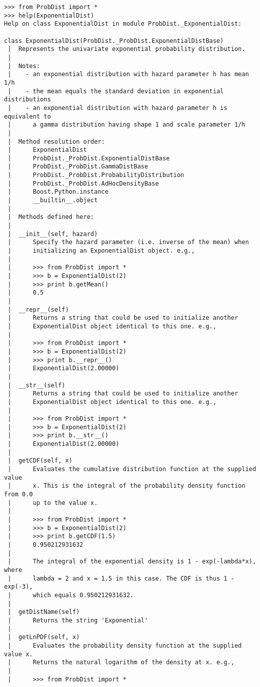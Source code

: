\documentclass[10pt]{article}
\begin{document}
{\tiny
\begin{verbatim}
>>> from ProbDist import *
>>> help(ExponentialDist)
Help on class ExponentialDist in module ProbDist._ExponentialDist:

class ExponentialDist(ProbDist._ProbDist.ExponentialDistBase)
 |  Represents the univariate exponential probability distribution.
 |
 |  Notes:
 |    - an exponential distribution with hazard parameter h has mean 1/h
 |    - the mean equals the standard deviation in exponential distributions
 |    - an exponential distribution with hazard parameter h is equivalent to
 |      a gamma distribution having shape 1 and scale parameter 1/h
 |
 |  Method resolution order:
 |      ExponentialDist
 |      ProbDist._ProbDist.ExponentialDistBase
 |      ProbDist._ProbDist.GammaDistBase
 |      ProbDist._ProbDist.ProbabilityDistribution
 |      ProbDist._ProbDist.AdHocDensityBase
 |      Boost.Python.instance
 |      __builtin__.object
 |
 |  Methods defined here:
 |
 |  __init__(self, hazard)
 |      Specify the hazard parameter (i.e. inverse of the mean) when
 |      initializing an ExponentialDist object. e.g.,
 |
 |      >>> from ProbDist import *
 |      >>> b = ExponentialDist(2)
 |      >>> print b.getMean()
 |      0.5
 |
 |  __repr__(self)
 |      Returns a string that could be used to initialize another
 |      ExponentialDist object identical to this one. e.g.,
 |
 |      >>> from ProbDist import *
 |      >>> b = ExponentialDist(2)
 |      >>> print b.__repr__()
 |      ExponentialDist(2.00000)
 |
 |  __str__(self)
 |      Returns a string that could be used to initialize another
 |      ExponentialDist object identical to this one. e.g.,
 |
 |      >>> from ProbDist import *
 |      >>> b = ExponentialDist(2)
 |      >>> print b.__str__()
 |      ExponentialDist(2.00000)
 |
 |  getCDF(self, x)
 |      Evaluates the cumulative distribution function at the supplied value
 |      x. This is the integral of the probability density function from 0.0
 |      up to the value x.
 |
 |      >>> from ProbDist import *
 |      >>> b = ExponentialDist(2)
 |      >>> print b.getCDF(1.5)
 |      0.950212931632
 |
 |      The integral of the exponential density is 1 - exp(-lambda*x), where
 |      lambda = 2 and x = 1.5 in this case. The CDF is thus 1 - exp(-3),
 |      which equals 0.950212931632.
 |
 |  getDistName(self)
 |      Returns the string 'Exponential'
 |
 |  getLnPDF(self, x)
 |      Evaluates the probability density function at the supplied value x.
 |      Returns the natural logarithm of the density at x. e.g.,
 |
 |      >>> from ProbDist import *

\end{verbatim}}
\end{document}
